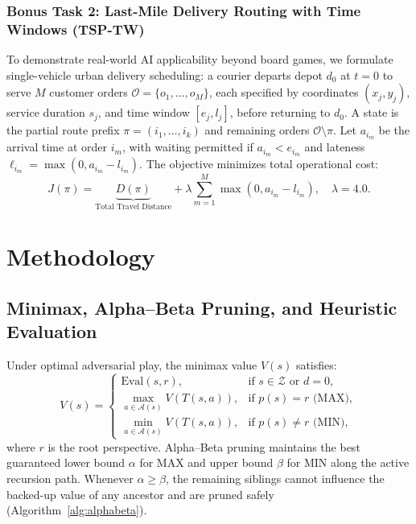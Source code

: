 \documentclass[conference]{IEEEtran}
\begin{document}
\subsubsection{Bonus Task 2: Last-Mile Delivery Routing with Time Windows (TSP-TW)}
To demonstrate real-world AI applicability beyond board games, we formulate single-vehicle urban delivery scheduling: a courier departs depot $d_0$ at $t=0$ to serve $M$ customer orders $\mathcal{O} = \{o_1, \dots, o_M\}$, each specified by coordinates $(x_j, y_j)$, service duration $s_j$, and time window $[e_j, l_j]$, before returning to $d_0$. A state is the partial route prefix $\pi = (i_1, \dots, i_k)$ and remaining orders $\mathcal{O} \setminus \pi$. Let $a_{i_m}$ be the arrival time at order $i_m$, with waiting permitted if $a_{i_m} < e_{i_m}$ and lateness $\ell_{i_m} = \max(0, a_{i_m} - l_{i_m})$. The objective minimizes total operational cost:
\begin{equation}
J(\pi) = \underbrace{D(\pi)}_{\text{Total Travel Distance}} + \lambda \sum_{m=1}^{M} \max(0, a_{i_m} - l_{i_m}), \quad \lambda = 4.0.
\end{equation}

\section{Methodology}
\subsection{Minimax, Alpha--Beta Pruning, and Heuristic Evaluation}
Under optimal adversarial play, the minimax value $V(s)$ satisfies:
\begin{equation}
V(s) =
\begin{cases}
\text{Eval}(s, r), & \text{if } s \in \mathcal{Z} \text{ or } d = 0, \\
\max_{a \in \mathcal{A}(s)} V(T(s,a)), & \text{if } p(s) = r \text{ (MAX)}, \\
\min_{a \in \mathcal{A}(s)} V(T(s,a)), & \text{if } p(s) \neq r \text{ (MIN)},
\end{cases}
\end{equation}
where $r$ is the root perspective. Alpha--Beta pruning maintains the best guaranteed lower bound $\alpha$ for MAX and upper bound $\beta$ for MIN along the active recursion path. Whenever $\alpha \ge \beta$, the remaining siblings cannot influence the backed-up value of any ancestor and are pruned safely (Algorithm~\ref{alg:alphabeta}).
\end{document}
